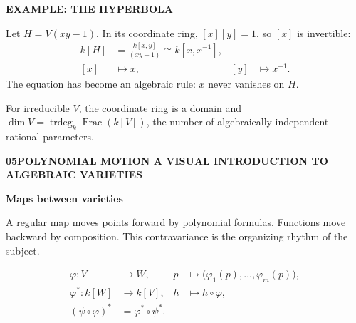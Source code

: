 \documentclass[9pt,a4paper]{extarticle}
\DeclareMathOperator{\trdeg}{trdeg}
\DeclareMathOperator{\Frac}{Frac}
\newcommand{\kk}{k}
\newcommand{\footertext}{ALGEBRAIC VARIETIES}
\newcommand{\pagehead}[3]{%
  {\fontsize{7.2}{8}\selectfont\bfseries\color{teal}#1\quad #2\hfill
   \normalfont\color{muted}A VISUAL INTRODUCTION TO ALGEBRAIC VARIETIES}\par
  \vspace{2.5pt}{\color{line}\hrule height 0.45pt}\vspace{8pt}
  {\fontsize{21}{23}\selectfont\bfseries\color{navy}#3}\par\vspace{5pt}}
\newcommand{\lead}[1]{{\fontsize{11.2}{15.2}\selectfont #1\par}\vspace{6pt}}
\newcommand{\eyebrow}[1]{{\fontsize{7.2}{8}\selectfont\bfseries\color{teal}\MakeUppercase{#1}}}
\begin{document}
\vspace{3pt}
\begin{tealbox}
\begin{minipage}[t]{.34\textwidth}
\eyebrow{Example: the hyperbola}\par\vspace{3pt}
\begin{center}
\end{center}
\end{minipage}\hfill
\begin{minipage}[t]{.61\textwidth}
Let $H=V(xy-1)$. In its coordinate ring, $[x][y]=1$, so $[x]$ is invertible:
\begin{align*}
\kk[H]
  &=\frac{\kk[x,y]}{(xy-1)}
    \cong \kk[x,x^{-1}],\\
[x]&\longmapsto x,
&[y]&\longmapsto x^{-1}.
\end{align*}
The equation has become an algebraic rule: $x$ never vanishes on $H$.
\end{minipage}
\end{tealbox}

\vspace{4pt}
{\small For irreducible $V$, the coordinate ring is a domain and
$\displaystyle \dim V=\trdeg_{\kk}\Frac(\kk[V])$, the number of algebraically independent rational parameters.}
\newpage

\renewcommand{\footertext}{REGULAR MAPS / PULLBACK / PARAMETRIZATION / NORMALIZATION}
\pagehead{05}{POLYNOMIAL MOTION}{Maps between varieties}
\lead{A regular map moves points forward by polynomial formulas. Functions move backward by composition. This contravariance is the organizing rhythm of the subject.}

\begin{mathbox}
\begin{align*}
\varphi:V&\longrightarrow W,
&p&\longmapsto\bigl(\varphi_1(p),\ldots,\varphi_m(p)\bigr),\\
\varphi^*:\kk[W]&\longrightarrow\kk[V],
&h&\longmapsto h\circ\varphi,\\
(\psi\circ\varphi)^*&=\varphi^*\circ\psi^*.
\end{align*}
\end{mathbox}
\end{document}
